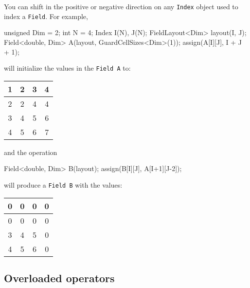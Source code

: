 You can shift in the positive or negative direction on any \texttt{Index} object used to index a \texttt{Field}. For example, \\
\begin{code}
unsigned Dim = 2;
int N = 4;
Index I(N), J(N);
FieldLayout<Dim> layout(I, J);
Field<double, Dim> A(layout, GuardCellSizes<Dim>(1));
assign(A[I][J], I + J + 1);
\end{code}
will initialize the values in the \texttt{Field A} to:
%
   \begin{center}
        \begin{tabular}{|c|c|c|c|}
        \hline
        1 & 2 & 3 & 4 \\        \hline
        2 & 2 & 4 & 4 \\        \hline
        3 & 4 & 5 & 6 \\        \hline
        4 & 5 & 6 & 7 \\        \hline
        \end{tabular}
   \label{tbl:t2}
   \end{center}
%
and the operation 
\begin{smallcode}
Field<double, Dim> B(layout);
assign(B[I][J], A[I+1][J-2]);
\end{smallcode}
will produce a \texttt{Field B} with the values:
%
   \begin{center}
        \begin{tabular}{|c|c|c|c|}
        \hline
        0 & 0 & 0 & 0 \\        \hline
        0 & 0 & 0 & 0 \\        \hline
        3 & 4 & 5 & 0 \\        \hline
        4 & 5 & 6 & 0 \\        \hline
        \end{tabular}
   \end{center}

\subsection{Overloaded operators}

